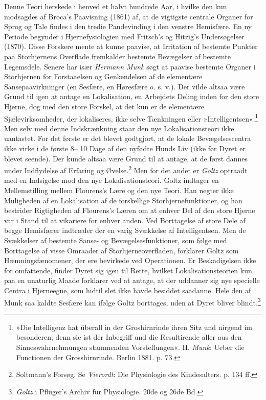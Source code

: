 \documentclass[12pt,a4paper,openany]{book}
\newcommand{\opage}[1]{\marginnote{\footnotesize\textit{[#1]}}}
\begin{document}
Denne Teori herskede i henved et halvt hundrede Aar, i hvilke den kun
modsagdes af Broca’s Paavisning (1861) af, at de vigtigste centrale
Organer for Sprog og Tale findes i den tredie Pandevinding i den venstre
Hemisfære. En ny Periode begynder i Hjernefysiologien med Fritsch’s og
Hitzig’s Undersøgelser (1870). Disse Forskere mente at kunne paavise, at
Irritation af bestemte Punkter paa Storhjernens Overflade fremkalder
bestemte Bevægelser af bestemte Legemsdele. Senere har især
\emph{Hermann Munk} søgt at paavise bestemte Organer i Storhjernen for
Forstaaelsen og Genkendelsen af de elementære Sansepaavirkninger (en
Sesfære, en Høresfære o. s. v.). Der vilde altsaa være Grund til igen at
antage en Lokalisation, en Arbejdets Deling inden for den store Hjerne,
dog med den store Forskel, at det kun er de elementære
Sjælevirksomheder,
\opage{50}der lokaliseres, ikke selve Tænkningen eller
»Intelligentsen«.\footnote[1]{»Die Intelligenz hat überall in der
Groshirnrinde ihren Sitz und nirgend im besonderen; denn sie ist der
Inbegriff und die Resultirende aller aus den Sinneswahrnehmungen
stammenden Vorstellungen«. H. \emph{Munk}: Ueber die Functionen der
Grosshirnrinde. Berlin 1881. p. 73.} Men selv med denne Indskrænkning
staar den nye Lokalisationsteori ikke uantastet. For det første er det
blevet godtgjort, at de lokale Bevægelsescentra ikke virke i de første
8-- 10 Dage af den nyfødte Hunds Liv (ikke før Dyret er blevet seende).
Der kunde altsaa være Grund til at antage, at de først dannes under
Indflydelse af Erfaring og Øvelse.\footnote[2]{Soltmann’s Forsøg. Se
\emph{Vierordt}: Die Physiologie des Kindesalters. p. 134 ff.} Men for
det andet er \emph{Goltz} optraadt med en Indsigelse mod den nye
Lokalisationsteori. Goltz indtager en Mellemstilling mellem Flourens’s
Lære og den nye Teori. Han negter ikke Muligheden af en Lokalisation af
de forskellige Storhjernefunktioner, og han bestrider Rigtigheden af
Flourens’s Læren om at enhver Del af den store Hjerne var i Stand til at
vikariere for enhver anden. Ved Borttagelse af store Dele af begge
Hemisfærer indtræder der en varig Svækkelse af Intelligentsen. Men de
Svækkelser af bestemte Sanse- og Bevægelsesfunktioner, som følge med
Borttagelse af visse Omraader af Storhjerneoverfladen, forklarer Goltz
som Hæmningsfænomener, der ere bevirkede ved Operationen. Er
Beskadigelsen ikke for omfattende, finder Dyret sig igen til Rette,
hvilket Lokalisationsteorien kun paa en unaturlig Maade forklarer ved at
antage, at der uddanner sig nye specielle Centra i Hjerneegne, som
hidtil slet ikke havde besiddet saadanne. Hele den af Munk saa kaldte
Sesfære kan ifølge Goltz borttages, uden at Dyret bliver
blindt.\footnote[3]{\emph{Goltz} i Pflüger’s Archiv für Physiologie.
20de og 26de Bd.}
\end{document}
